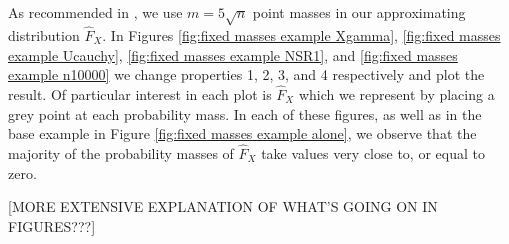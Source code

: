 	As recommended in \cite{Delaigle2016-la}, we use $m = 5\sqrt{n}$ point masses in our approximating distribution $\hat{F}_X$. In Figures \ref{fig:fixed masses example Xgamma}, \ref{fig:fixed masses example Ucauchy}, \ref{fig:fixed masses example NSR1}, and \ref{fig:fixed masses example n10000} we change properties 1, 2, 3, and 4 respectively and plot the result. Of particular interest in each plot is $\hat{F}_X$ which we represent by placing a grey point at each probability mass. In each of these figures, as well as in the base example in Figure \ref{fig:fixed masses example alone}, we observe that the majority of the probability masses of $\hat{F}_X$ take values very close to, or equal to zero.

	[MORE EXTENSIVE EXPLANATION OF WHAT'S GOING ON IN FIGURES???]


